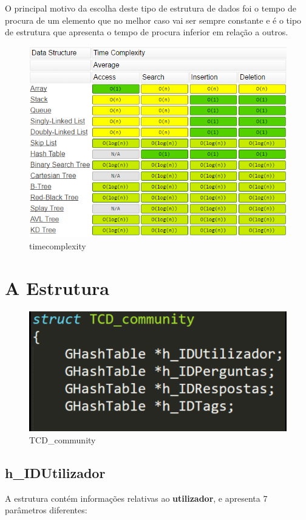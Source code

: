 \documentclass[a4paper]{article}
\begin{document}
O principal motivo da escolha deste tipo de estrutura de dados foi o tempo de procura de um elemento que no melhor caso vai ser sempre constante e é o tipo de estrutura que apresenta o tempo de procura inferior em relação a outros.

 
\begin{figure}[ht]
\centering
\includegraphics[scale =0.25]{timecomplexity.jpeg}
\caption{timecomplexity}
\label{img:time_complexity}
\end{figure}


\section{A Estrutura}

\begin{figure}[ht]
\centering
\includegraphics[scale =0.25]{tcd.png}
\caption{TCD_community}
\label{img:tcd}
\end{figure}

	\subsection{h_IDUtilizador}
	A estrutura contém informações relativas ao \textbf{utilizador}, e apresenta 7 parâmetros diferentes:
\end{document}
